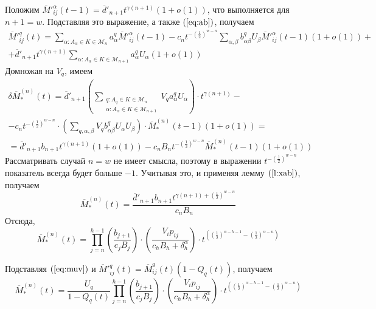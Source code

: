 \documentclass[12pt]{article}
\begin{document}
Положим $\overline{M}'^\alpha_{ij}(t-1) = \overline{d}'_{n+1} t^{\gamma(n+1)} (1 + o(1))$, что выполняется для $n+1 = w$. Подставляя это выражение, а также $(\ref{eq:ab})$, получаем
\begin{multline*}
	\overline{M}'^q_{ij}(t) = \sum_{\alpha : A_\alpha \in K \in \mathcal{M}_n} a^q_\alpha \overline{M}'^\alpha_{ij}(t-1) - c_n t^{-\left(\frac{1}{2}\right)^{w-n}} \sum_{\alpha,\beta} b^q_{\alpha \beta} U_\beta \overline{M}'^\alpha_{ij}(t-1) (1 + o(1)) + \\
	+ \overline{d}'_{n+1} t^{\gamma(n+1)} \sum_{\alpha : A_\alpha \in K \in \mathcal{M}_{n+1}} a^q_\alpha U_\alpha (1 + o(1))
\end{multline*}
Домножая на $V_q$, имеем
\begin{multline*}
	\delta \overline{M}^{(n)}_*(t) = \overline{d}'_{n+1} \left( \sum_{\substack{q : A_q \in K \in \mathcal{M}_n \\ \alpha : A_\alpha \in K \in \mathcal{M}_{n+1}}} V_q a^q_\alpha U_\alpha \right) \cdot t^{\gamma(n+1)} - \\
	- c_n t^{-\left(\frac{1}{2}\right)^{w-n}} \cdot \left( \sum_{q,\alpha,\beta} V_q b^q_{\alpha \beta} U_\alpha U_\beta \right) \cdot \overline{M}^{(n)}_*(t-1) (1 + o(1)) = \\
	= \overline{d}'_{n+1} b_{n+1} t^{\gamma(n+1)} (1 + o(1)) - c_n B_n t^{-\left(\frac{1}{2}\right)^{w-n}} \overline{M}^{(n)}_*(t-1) (1 + o(1))
\end{multline*}
Рассматривать случай $n = w$ не имеет смысла, поэтому в выражении $t^{-\left(\frac{1}{2}\right)^{w-n}}$ показатель всегда будет больше $-1$. Учитывая это, и применяя лемму $(\ref{l:xab})$, получаем
\begin{equation*}
	\overline{M}^{(n)}_*(t) = \frac{\overline{d}'_{n+1} b_{n+1} t^{\gamma(n+1) + \left(\frac{1}{2}\right)^{w-n}}}{c_n B_n}
\end{equation*}
Отсюда,
\begin{equation*}
	\overline{M}^{(n)}_*(t) = \prod_{j = n}^{h-1} \left( \frac{b_{j+1}}{c_j B_j} \right) \cdot \left( \frac{V_i p_{ij}}{c_h B_h + \delta^\alpha_h} \right) \cdot t^{\left( \left(\frac{1}{2}\right)^{\alpha - h - 1} - \left(\frac{1}{2}\right)^{\alpha - n} \right)}
\end{equation*}

Подставляя $(\ref{eq:muv})$ и $\overline{M}'^q_{ij}(t) = \overline{M}^q_{ij}(t) (1 - Q_q(t))$, получаем
\begin{equation*}
	\overline{M}^{(n)}_*(t) = \frac{U_q}{1 - Q_q(t)} \prod_{j = n}^{h-1} \left( \frac{b_{j+1}}{c_j B_j} \right) \cdot \left( \frac{V_i p_{ij}}{c_h B_h + \delta^\alpha_h} \right) \cdot t^{\left( \left(\frac{1}{2}\right)^{\alpha - h - 1} - \left(\frac{1}{2}\right)^{\alpha - n} \right)}
\end{equation*}
\end{document}
